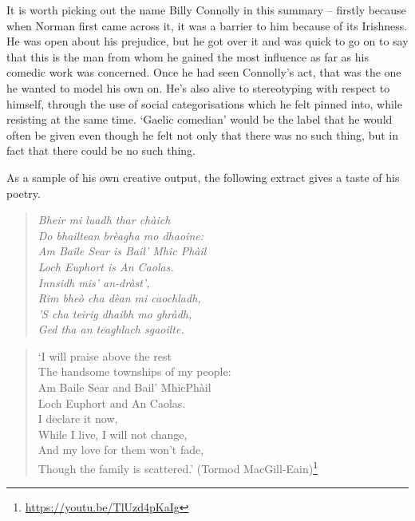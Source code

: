 \documentclass[output=paper,colorlinks,citecolor=brown]{langscibook}
\begin{document}
It is worth picking out the name Billy Connolly in this summary – firstly because when Norman first came across it, it was a barrier to him because of its Irishness. He was open about his prejudice, but he got over it and was quick to go on to say that this is the man from whom he gained the most influence as far as his comedic work was concerned. Once he had seen Connolly’s act, that was the one he wanted to model his own on. He’s also alive to stereotyping with respect to himself, through the use of social categorisations which he felt pinned into, while resisting at the same time. `Gaelic comedian' would be the label that he would often be given even though he felt not only that there was no such thing, but in fact that there could be no such thing.

As a sample of his own creative output, the following extract gives a taste of his poetry.

\begin{quote}
\textit{Bheir mi luadh thar chàich      \\
Do bhailtean brèagha mo dhaoine:    \\
Am Baile Sear is Bail’ Mhic Phàil    \\
Loch Euphort is An Caolas.      \\
Innsidh mis’ an-dràst’,        \\
Rim bheò cha dèan mi caochladh,    \\
’S cha teirig dhaibh mo ghràdh,      \\
Ged tha an teaghlach sgaoilte. }
\end{quote}

\begin{quote}
`I will praise above the rest\\
The handsome townships of my people:\\
Am Baile Sear and Bail’ MhicPhàil\\
Loch Euphort and An Caolas.\\
I declare it now,\\
While I live, I will not change,\\
And my love for them won’t fade,\\
Though the family is scattered.'
(Tormod MacGill-Eain)\footnote{\url{https://youtu.be/TlUzd4pKaIg}} 
\end{quote}

\end{document}

